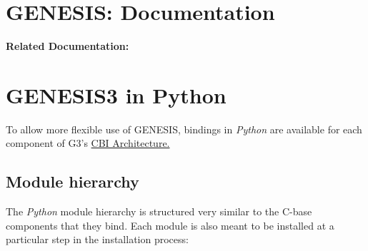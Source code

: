 \documentclass[12pt]{article}
\begin{document}
\section*{GENESIS: Documentation}

{\bf Related Documentation:}

\section*{GENESIS3 in Python}

	To allow more flexible use of GENESIS, bindings in {\it Python} are available for each component of G3's \href{../cbi-architecture/cbi-architecture.tex}{CBI Architecture.} 

\subsection*{Module hierarchy}

	The {\it Python} module hierarchy is structured very similar to the C-base components that they bind. Each module is also meant to be installed at a particular step in the installation process:
	
\end{document}
